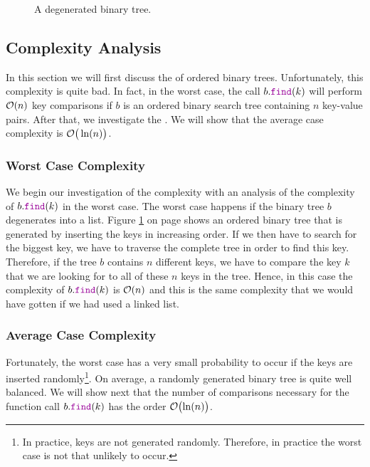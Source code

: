 \begin{figure}[!th]
  \centering 
  \caption{A degenerated binary tree.}
  \label{fig:degenerated}
\end{figure}


\subsection{Complexity Analysis}
In this section we will first discuss the  of ordered binary trees.  Unfortunately,
this complexity is quite bad.  In fact, in 
the worst case, the call $b.\mytt{find}(k)$ will perform $\mathcal{O}(n)$ key comparisons if $b$ is an ordered
binary search tree containing $n$ key-value pairs.  After that, we investigate the .  We
will show that the average case complexity is $\mathcal{O}\bigr(\ln(n)\bigr)$.

\subsubsection{Worst Case Complexity}
We begin our investigation of the complexity with an analysis of the complexity of $b.\mytt{find}(k)$ 
in the worst case.  The worst case happens if the binary tree $b$ degenerates into a list.
Figure \ref{fig:degenerated} on page \pageref{fig:degenerated} shows an ordered binary tree that
is generated by inserting the keys in increasing order.  If we then have to search for the
biggest key, we have to traverse the complete tree in order to find this key.  Therefore, if the
tree $b$ contains $n$ different keys, we have to compare the key $k$ that we are looking for to all
of these $n$ keys in the tree.  Hence, in this case the complexity of $b.\mytt{find}(k)$ is 
$\mathcal{O}(n)$ and this is the same complexity that we would have gotten if we had used a linked list.


\subsubsection{Average Case Complexity}
Fortunately, the worst case has a very small probability to occur if the keys are inserted randomly\footnote{
  In practice, keys are not generated randomly.  Therefore, in practice the worst case is not that unlikely to occur.
}. On average, a randomly generated
binary tree is quite well balanced.  We will show next that the number of comparisons necessary for
the function call $b.\mytt{find}(k)$ has the order $\mathcal{O}\bigl(\ln(n)\bigr)$.  


